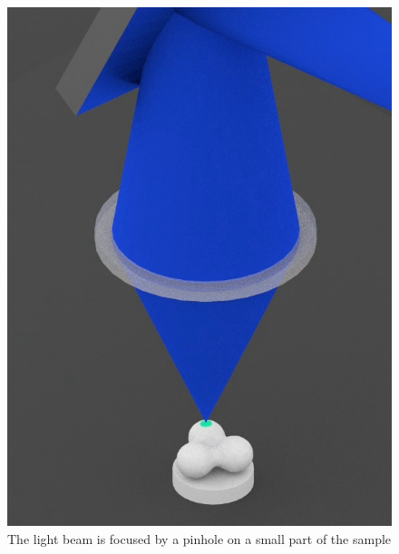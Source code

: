 \documentclass[t]{beamer}
\begin{document}
\begin{frame}
\begin{figure}
{     \includegraphics[scale=0.1]{CM-process-1-2}
     \caption{\footnotemark{}The light beam is focused by a pinhole on a small part of the sample}
     }
\end{figure}
\end{frame}
\end{document}
